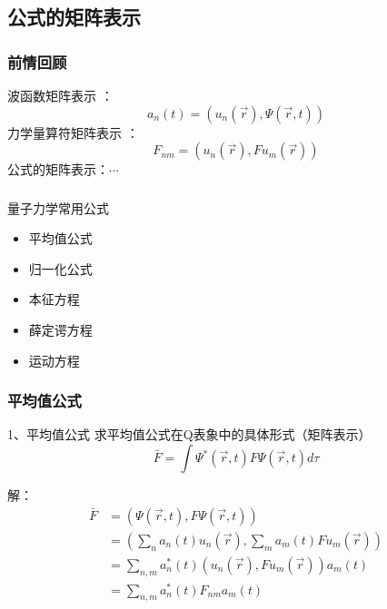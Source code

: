 

\subsection{公式的矩阵表示}

\begin{frame}
    \frametitle{前情回顾}
    \begin{itemize}
       \done 波函数矩阵表示 ：$$ a_n(t)=(u_n(\vec{r}), \Psi(\vec{r},t)) $$ 
       \done 力学量算符矩阵表示 ： $$ F_{nm}=(u_n (\vec{r}), Fu_m(\vec{r})) $$   
       \todo 公式的矩阵表示：$\cdots$
    \end{itemize}
\end{frame} 

\begin{frame} 
    \frametitle{}
    \begin{tcolorbox2}{量子力学常用公式}
        \begin{itemize}
            \item 平均值公式
            \item 归一化公式
            \item 本征方程
            \item 薛定谔方程
            \item 运动方程
        \end{itemize}   
    \end{tcolorbox2}
\end{frame} 

\begin{frame} 
    \frametitle{平均值公式}
    \begin{tcolorbox1}{1、平均值公式}
        求平均值公式在Q表象中的具体形式（矩阵表示）
        $$ \bar{F}=\int \Psi^* (\vec{r},t) F \Psi(\vec{r},t) d\tau $$
    \end{tcolorbox1}
    \alert{解：} 
    \begin{equation*}
        \begin{split}
            \bar{F}&=(\Psi(\vec{r},t), F\Psi(\vec{r},t)) \\
            &= (\sum_n a_n(t) u_n(\vec{r}), \sum_m a_m(t) F u_m(\vec{r}))\\
            &= \sum_{n,m} a_n ^*(t) (u_n(\vec{r}), F u_m(\vec{r})) a_m(t)\\
            &= \sum_{n,m} a_n ^*(t) F_{nm} a_m(t)\\
        \end{split} 
    \end{equation*}
\end{frame}

